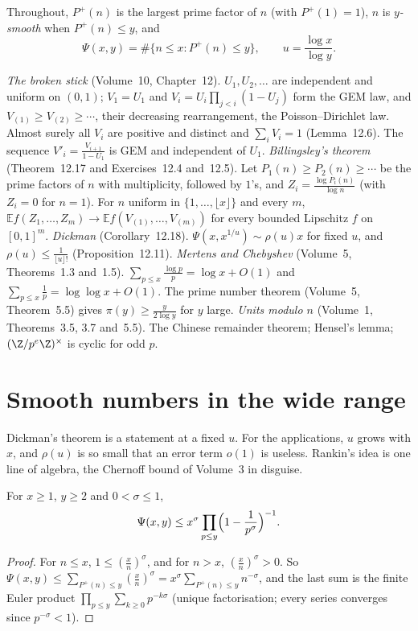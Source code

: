Throughout, $P^+(n)$ is the largest prime factor of $n$ (with $P^+(1)=1$), $n$ is \emph{$y$-smooth} when $P^+(n)\le y$, and
\[
\Psi(x,y)=\#\{n\le x:P^+(n)\le y\},\qquad u=\frac{\log x}{\log y}.
\]

\begin{reminder}
\emph{The broken stick} (Volume~10, Chapter~12). $U_1,U_2,\dots$ are independent and uniform on $(0,1)$; $V_1=U_1$ and $V_i=U_i\prod_{j<i}(1-U_j)$ form the GEM law, and $V_{(1)}\ge V_{(2)}\ge\cdots$, their decreasing rearrangement, the Poisson--Dirichlet law. Almost surely all $V_i$ are positive and distinct and $\sum_iV_i=1$ (Lemma~12.6). The sequence $V'_i=\frac{V_{i+1}}{1-U_1}$ is GEM and independent of $U_1$.
\emph{Billingsley's theorem} (Theorem~12.17 and Exercises~12.4 and~12.5). Let $P_1(n)\ge P_2(n)\ge\cdots$ be the prime factors of $n$ with multiplicity, followed by $1$'s, and $Z_i=\frac{\log P_i(n)}{\log n}$ (with $Z_i=0$ for $n=1$). For $n$ uniform in $\{1,\dots,\lfloor x\rfloor\}$ and every $m$, $\mathbb Ef(Z_1,\dots,Z_m)\to\mathbb Ef(V_{(1)},\dots,V_{(m)})$ for every bounded Lipschitz $f$ on $[0,1]^m$.
\emph{Dickman} (Corollary~12.18). $\Psi(x,x^{1/u})\sim\rho(u)x$ for fixed $u$, and $\rho(u)\le\frac1{\lfloor u\rfloor!}$ (Proposition~12.11).
\emph{Mertens and Chebyshev} (Volume~5, Theorems~1.3 and~1.5). $\sum_{p\le x}\frac{\log p}p=\log x+O(1)$ and $\sum_{p\le x}\frac1p=\log\log x+O(1)$. The prime number theorem (Volume~5, Theorem~5.5) gives $\pi(y)\ge\frac y{2\log y}$ for $y$ large.
\emph{Units modulo $n$} (Volume~1, Theorems~3.5, 3.7 and~5.5). The Chinese remainder theorem; Hensel's lemma; $(\Z/p^e\Z)^\times$ is cyclic for odd $p$.
\end{reminder}

\section{Smooth numbers in the wide range}\label{sec:rankin}

Dickman's theorem is a statement at a fixed $u$. For the applications, $u$ grows with $x$, and $\rho(u)$ is so small that an error term $o(1)$ is useless. Rankin's idea is one line of algebra, the Chernoff bound of Volume~3 in disguise.

\begin{proposition}\label{prop:rankin}
For $x\ge1$, $y\ge2$ and $0<\sigma\le1$,
\[
\Psi(x,y)\le x^\sigma\prod_{p\le y}\Bigl(1-\frac1{p^\sigma}\Bigr)^{-1}.
\]
\end{proposition}
\begin{proof}
For $n\le x$, $1\le(\frac xn)^\sigma$, and for $n>x$, $(\frac xn)^\sigma>0$. So
$\Psi(x,y)\le\sum_{P^+(n)\le y}(\frac xn)^\sigma=x^\sigma\sum_{P^+(n)\le y}n^{-\sigma}$, and the last sum is the finite Euler product $\prod_{p\le y}\sum_{k\ge0}p^{-k\sigma}$ (unique factorisation; every series converges since $p^{-\sigma}<1$).
\end{proof}

